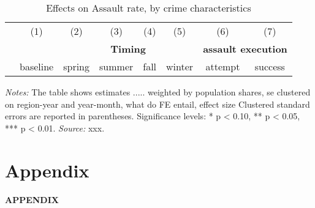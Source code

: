 \documentclass[11pt, a4paper]{article} %
\begin{document}
\begin{landscape}
	\vspace*{\fill}
	\begin{table}[H] \centering 
		\begin{threeparttable} \centering \caption{Effects on Assault rate, by crime characteristics}
			\label{tab_soc_ext:reg_fe_assrate_crime_chars}
			{\def\sym#1{\ifmmode^{#1}\else\(^{#1}\)\fi} 
				\begin{tabular}{l*{7}{c}}
					\toprule 
					&\multicolumn{1}{c}{(1)}&\multicolumn{1}{c}{(2)}&\multicolumn{1}{c}{(3)}&\multicolumn{1}{c}{(4)}&\multicolumn{1}{c}{(5)}&\multicolumn{1}{c}{(6)} &\multicolumn{1}{c}{(7)}\\
					& & \multicolumn{4}{c}{\textbf{Timing}} & \multicolumn{2}{c}{\textbf{assault execution}} \\
					\cmidrule(lr){3-6} \cmidrule(lr){7-8}
					& baseline & spring & summer & fall & winter & attempt & success \\
					\midrule
					 
					\bottomrule 
			\end{tabular}}
			\begin{tablenotes} 
				\item \scriptsize \emph{Notes:} The table shows estimates ..... 
				weighted by population shares, se clustered on region-year and year-month, what do FE entail, effect size
				Clustered standard errors are reported in parentheses. \newline Significance levels: * p < 0.10, ** p < 0.05, *** p < 0.01. \newline 	\emph{Source:} xxx.
			\end{tablenotes} 
		\end{threeparttable} 
	\end{table}
	\vspace*{\fill}\clearpage 
\end{landscape}







\newpage
\TODO\section{Appendix}
\vspace*{\fill}
{\Huge \begin{center}\textbf{APPENDIX}\end{center}}
\vspace*{\fill}\clearpage
\end{document}
